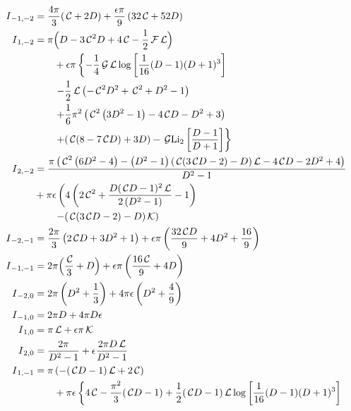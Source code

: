 \documentclass[prd,preprintnumbers,nofootinbib,superscriptaddress,onecolumn,preprint]{revtex4-1}
\newcommand\3[1]{\boldsymbol{#1}}
\newcommand{\cosfun}{\ensuremath{\mathcal{ \, C}}}
\newcommand{\ffun}{\ensuremath{\mathcal{\, F}}}
\newcommand{\ggun}{\ensuremath{ \mathcal{\, G}}}
\newcommand{\llun}{\ensuremath{ \mathcal{\, L}}}
\newcommand{\kkun}{\ensuremath{ \mathcal{\, K}}}
\begin{document}
\begin{align}
I{}_{-1,-2}  &{}= \frac{4 \pi}{3} ( \cosfun+2 D) + \frac{\epsilon \pi}{9} \left(32 \cosfun+52 D\right)  \\
I{}_{1,-2}   &{} =  \pi \Bigl( D - 3   \cosfun^2 D+4  \cosfun-\frac{1}{2}  \ffun \llun \Bigr) \nonumber \\
                 &{} \qquad+ \epsilon \pi \left\{-\frac{1}{4}  \ggun \llun \log \left[\frac{1}{16} (D-1) (D+1)^3\right] 
                 \right. \nonumber \\  &{} \qquad \left. - \frac{1}{2} \llun \left(-\cosfun^2 D^2+ \cosfun^2+D^2-1 \right) \right. \nonumber \\
                 &{} \qquad\left. + \frac{1}{6} \pi ^2 \left(\cosfun^2 \left(3 D^2-1\right)-4 \cosfun D-D^2+3\right)
                 \right. \nonumber \\  &{} \qquad \left.  + (\cosfun (8-7 \cosfun D)+3 D) - \ggun \text{Li}_2\left[\frac{D-1}{D+1}\right]  \right\} \\
				  I{}_{2,-2}   &{} = \frac{\pi  \left(\cosfun^2 \left(6 D^2-4\right)-\left(D^2-1\right) (\cosfun (3 \cosfun D-2)-D) \llun-4 \cosfun D-2 D^2+4\right)}{D^2-1} \nonumber \\ 
                 &{} + \pi  \epsilon  \left(4 \left(2 \cosfun^2+\frac{D (\cosfun D-1)^2 \llun}{2 \left(D^2-1\right)}-1\right) \right. \nonumber \\ 
                 &{} \left. \qquad -(\cosfun (3 \cosfun D-2)-D) \kkun\right) \\
I{}_{-2,-1}  &{}= \frac{2 \pi}{3} \left(2  \cosfun D+3 D^2+ 1 \right) + \epsilon \pi \left(\frac{32 \cosfun D}{9}+4 D^2+\frac{16}{9}\right)  \\
I{}_{-1,-1}  &{}=  2 \pi \Bigl( \frac{\cosfun }{3}+D \Bigr) + \epsilon \pi \left(\frac{16  \cosfun}{9}+4  D\right)  \\
I{}_{-2,0}  &{}= 2 \pi  \left( D^2+\frac{1}{3} \right) +  4 \pi \epsilon \left( D^2+\frac{4}{9}\right) \\
I{}_{-1,0}  &{}= 2 \pi  D + 4 \pi  D \epsilon \\
I{}_{1,0}  &{}=  \pi  \llun  +  \epsilon \pi \kkun \\
I{}_{2,0}  &{}=  \frac{2 \pi }{D^2-1}  + \epsilon \frac{2 \pi  D \llun}{D^2-1} \\
I{}_{1,-1}   &{} = \pi \left(-(\cosfun D-1) \llun+2 \cosfun\right) \nonumber \\
                 &{} \qquad + \pi \epsilon \left\{ 4 \cosfun-\frac{\pi^2}{3} (\cosfun D-1)+\frac{1}{2} (\cosfun D-1) \llun \log \left[\frac{1}{16} (D-1) (D+1)^3\right] \right. \nonumber \\

\end{align}
\end{document}
